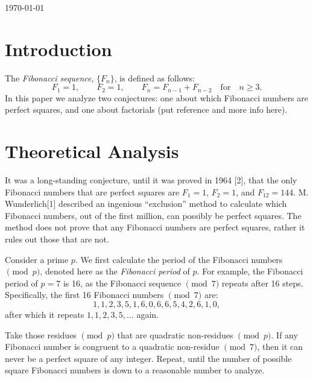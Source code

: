 \documentclass[11pt]{article}
\begin{document}
\begin{titlepage}
{\large \today}\\[3cm] 


 

\vfill 

\end{titlepage}

\tableofcontents
\newpage
\newpage

\section{Introduction}

The \textit{Fibonacci sequence}, $\{F_n\}$, is defined as follows: \[ F_1 = 1, \qquad F_2 = 1, \qquad F_n = F_{n - 1} + F_{n - 2} \quad \text{for} \quad n \geq 3. \] In this paper we analyze two conjectures: one about which Fibonacci numbers are perfect squares, and one about factorials (put reference and more info here).

\section{Theoretical Analysis}

It was a long-standing conjecture, until it was proved in 1964 [2], that the only Fibonacci numbers that are perfect squares are $F_1 = 1$, $F_2 = 1$, and $F_12 = 144$. M. Wunderlich[1] described an ingenious ``exclusion'' method to calculate which Fibonacci numbers, out of the first million, can possibly be perfect squares. The method does not prove that any Fibonacci numbers are perfect squares, rather it rules out those that are not.

Consider a prime $p$. We first calculate the period of the Fibonacci numbers $\pmod p$, denoted here as the \textit{Fibonacci period} of $p$. For example, the Fibonacci period of $p = 7$ is 16, as the Fibonacci sequence $\pmod 7$ repeats after 16 steps. Specifically, the first 16 Fibonacci numbers $\pmod{7}$ are: \[ 1, 1, 2, 3, 5, 1, 6, 0, 6, 6, 5, 4, 2, 6, 1, 0, \] after which it repeats $1, 1, 2, 3, 5, \dots$ again.

Take those residues $\pmod{p}$ that are quadratic non-residues $\pmod{p}$. If any Fibonacci number is congruent to a quadratic non-residue $\pmod{7}$, then it can never be a perfect square of any integer. Repeat, until the number of possible square Fibonacci numbers is down to a reasonable number to analyze. 
\end{document}
